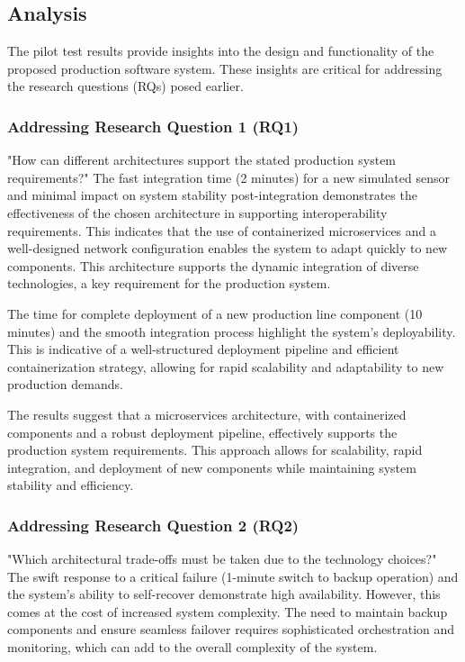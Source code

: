 \documentclass[conference]{IEEEtran}
\begin{document}
\subsection{Analysis}
\label{sec:analysis}
The pilot test results provide insights into the design and functionality of the proposed production software system. These insights are critical for addressing the research questions (RQs) posed earlier.

\subsubsection*{Addressing Research Question 1 (RQ1)}

"How can different architectures support the stated production system requirements?"
The fast integration time (2 minutes) for a new simulated sensor and minimal impact on system stability post-integration demonstrates the effectiveness of the chosen architecture in supporting interoperability requirements. This indicates that the use of containerized microservices and a well-designed network configuration enables the system to adapt quickly to new components. This architecture supports the dynamic integration of diverse technologies, a key requirement for the production system.

The time for complete deployment of a new production line component (10 minutes) and the smooth integration process highlight the system's deployability. This is indicative of a well-structured deployment pipeline and efficient containerization strategy, allowing for rapid scalability and adaptability to new production demands.

The results suggest that a microservices architecture, with containerized components and a robust deployment pipeline, effectively supports the production system requirements. This approach allows for scalability, rapid integration, and deployment of new components while maintaining system stability and efficiency.

\subsubsection*{Addressing Research Question 2 (RQ2)}

"Which architectural trade-offs must be taken due to the technology choices?"
The swift response to a critical failure (1-minute switch to backup operation) and the system's ability to self-recover demonstrate high availability. However, this comes at the cost of increased system complexity. The need to maintain backup components and ensure seamless failover requires sophisticated orchestration and monitoring, which can add to the overall complexity of the system.
\end{document}
